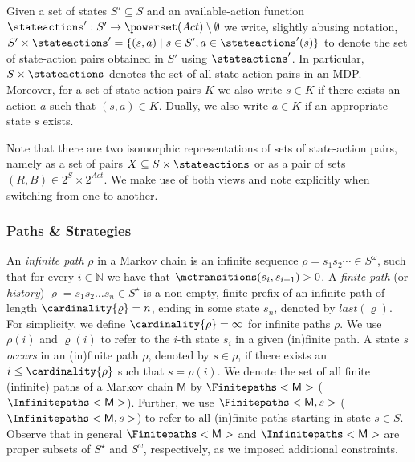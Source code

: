 \documentclass{article}
\newcommand{\Naturals}{\mathbb{N}}
\newcommand{\MC}{\mathsf{M}}
\newcommand{\States}{S}
\newcommand{\Actions}{Act}
\newcommand{\infinitepath}{\rho}
\newcommand{\finitepath}{\varrho}
\newcommand{\last}[1]{last(#1)}
\begin{document}
Given a set of states $\States' \subseteq \States$ and an available-action function $\stateactions' : \States' \to \powerset(\Actions) \setminus \emptyset$ we write, slightly abusing notation, $\States' \times \stateactions' = \{(s, a) \mid s \in \States', a \in \stateactions'(s)\}$ to denote the set of state-action pairs obtained in $\States'$ using $\stateactions'$.
In particular, $\States \times \stateactions$ denotes the set of all state-action pairs in an MDP.
Moreover, for a set of state-action pairs $K$ we also write $s \in K$ if there exists an action $a$ such that $(s, a) \in K$.
Dually, we also write $a \in K$ if an appropriate state $s$ exists.

Note that there are two isomorphic representations of sets of state-action pairs, namely as a set of pairs $X \subseteq \States \times \stateactions$ or as a pair of sets $(R, B) \in 2^\States \times 2^{\Actions}$.
We make use of both views and note explicitly when switching from one to another.

\subsubsection*{Paths \& Strategies}
An \emph{infinite path} $\infinitepath$ in a Markov chain is an infinite sequence $\infinitepath = s_1 s_2 \cdots \in \States^\omega$, such that for every $i \in \Naturals$ we have that $\mctransitions(s_i, s_{i+1}) > 0$.
A \emph{finite path} (or \emph{history}) $\finitepath = s_1 s_2 \dots s_n \in \States^\star$ is a non-empty, finite prefix of an infinite path of length $\cardinality{\finitepath} = n$, ending in some state $s_n$, denoted by $\last{\finitepath}$.
For simplicity, we define $\cardinality{\infinitepath} = \infty$ for infinite paths $\infinitepath$.
We use $\infinitepath(i)$ and $\finitepath(i)$ to refer to the $i$-th state $s_i$ in a given (in)finite path.
A state $s$ \emph{occurs} in an (in)finite path $\infinitepath$, denoted by $s \in \infinitepath$, if there exists an $i \leq \cardinality{\infinitepath}$ such that $s = \infinitepath(i)$.
We denote the set of all finite (infinite) paths of a Markov chain $\MC$ by $\Finitepaths<\MC>$ ($\Infinitepaths<\MC>$).
Further, we use $\Finitepaths<\MC, s>$ ($\Infinitepaths<\MC, s>$) to refer to all (in)finite paths starting in state $s \in \States$.
Observe that in general $\Finitepaths<\MC>$ and $\Infinitepaths<\MC>$ are proper subsets of $\States^\star$ and $\States^\omega$, respectively, as we imposed additional constraints.
\end{document}
